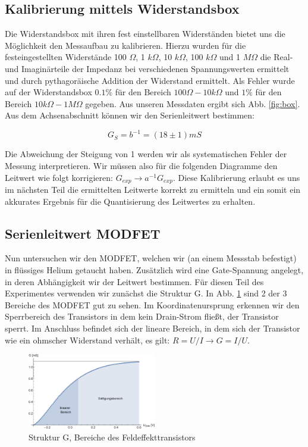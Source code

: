 \documentclass[aps,twocolumn,secnumarabic,nobalancelastpage,amsmath,amssymb,
nofootinbib,superscriptaddress]{revtex4-1}
\begin{document}
\subsection{Kalibrierung mittels Widerstandsbox}
Die Widerstandsbox mit ihren fest einstellbaren Widerständen bietet uns die
Möglichkeit den Messaufbau zu kalibrieren. Hierzu wurden für die festeingestellten
Widerstände 100 $\Omega$, 1 $k\Omega$, 10 $k\Omega$, 100 $k\Omega$ und 1 $M\Omega$
die Real- und Imaginärteile der Impedanz bei verschiedenen Spannungswerten ermittelt
und durch pythagoräische Addition der Widerstand ermittelt. Als Fehler wurde auf der
Widerstandsbox $0.1\%$ für den Bereich $100\Omega - 10k\Omega$ und $1\%$ für den
Bereich $10k\Omega - 1M\Omega$ gegeben. Aus unseren Messdaten ergibt sich Abb.
\ref{fig:box}. Aus dem Achsenabschnitt können wir den Serienleitwert bestimmen:

  \begin{equation}
    G_S = b^{-1} = (18 \pm 1) mS
  \end{equation}

Die Abweichung der Steigung von 1 werden wir als systematischen Fehler der Messung
interpretieren. Wir müssen also für die folgenden Diagramme den Leitwert wie folgt
korrigieren: $G_{exp} \rightarrow a^{-1} G_{exp}$. Diese Kalibrierung erlaubt es
uns im nächsten Teil die ermittelten Leitwerte korrekt zu ermitteln und ein somit
ein akkurates Ergebnis für die Quantisierung des Leitwertes zu erhalten.


\subsection{Serienleitwert MODFET}
Nun untersuchen wir den MODFET, welchen wir (an einem Messstab befestigt) in
flüssiges Helium getaucht haben. Zusätzlich wird eine Gate-Spannung angelegt,
in deren Abhängigkeit wir der Leitwert bestimmen. Für diesen Teil des Experimentes
verwenden wir zunächst die Struktur G. In Abb. \ref{fig:G} sind 2 der 3 Bereiche
des MODFET gut zu sehen. Im Koordinatenursprung erkennen wir den Sperrbereich des
Transistors in dem kein Drain-Strom fließt, der Transistor sperrt. Im Anschluss
befindet sich der lineare Bereich, in dem sich der Transistor wie ein ohmscher
Widerstand verhält, es gilt: $R = U/I \rightarrow G = I/U$.

\begin{figure}[h]
  \centering
  \includegraphics[width=0.5\textwidth]{Berechnung-Bilder/g.eps}
  \caption{Struktur G, Bereiche des Feldeffekttransistors}
  \label{fig:G}
\end{figure}
\end{document}

